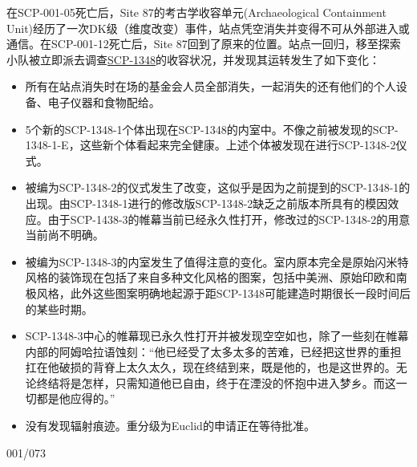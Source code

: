 \begin{scpbox}

在SCP-001-05死亡后，Site 87的考古学收容单元(Archaeological Containment Unit)经历了一次DK级（维度改变）事件，站点凭空消失并变得不可从外部进入或通信。在SCP-001-12死亡后，Site 87回到了原来的位置。站点一回归，移至探索小队被立即派去调查\hyperref[chhap:SCP-1348]{SCP-1348}的收容状况，并发现其运转发生了如下变化：

\begin{itemize}
	\item 所有在站点消失时在场的基金会人员全部消失，一起消失的还有他们的个人设备、电子仪器和食物配给。
	\item 5个新的SCP-1348-1个体出现在SCP-1348的内室中。不像之前被发现的SCP-1348-1-E，这些新个体看起来完全健康。上述个体被发现在进行SCP-1348-2仪式。
	\item 被编为SCP-1348-2的仪式发生了改变，这似乎是因为之前提到的SCP-1348-1的出现。由SCP-1348-1进行的修改版SCP-1348-2缺乏之前版本所具有的模因效应。由于SCP-1438-3的帷幕当前已经永久性打开，修改过的SCP-1348-2的用意当前尚不明确。
	\item 被编为SCP-1348-3的内室发生了值得注意的变化。室内原本完全是原始闪米特风格的装饰现在包括了来自多种文化风格的图案，包括中美洲、原始印欧和南极风格，此外这些图案明确地起源于距SCP-1348可能建造时期很长一段时间后的某些时期。
	\item SCP-1348-3中心的帷幕现已永久性打开并被发现空空如也，除了一些刻在帷幕内部的阿姆哈拉语蚀刻：“他已经受了太多太多的苦难，已经把这世界的重担扛在他破损的背脊上太久太久，现在终结到来，既是他的，也是这世界的。无论终结将是怎样，只需知道他已自由，终于在湮没的怀抱中进入梦乡。而这一切都是他应得的。”
	\item 没有发现辐射痕迹。重分级为Euclid的申请正在等待批准。
\end{itemize}

\end{scpbox}

001/073


